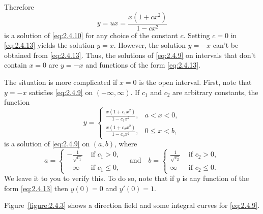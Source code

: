 \documentclass{ximera}
\begin{document}
\begin{example}
\begin{explanation}
\begin{center}
\end{center}

  

Therefore
\begin{equation} \label{eq:2.4.13}
y=ux=\frac{x(1+cx^2)}{1-cx^2}
\end{equation}
is a solution of \eqref{eq:2.4.10} for any choice of the constant $c$.
Setting $c=0$ in \eqref{eq:2.4.13} yields the solution $y=x$. However, the
solution $y=-x$ can't be obtained from \eqref{eq:2.4.13}. Thus, the
solutions of \eqref{eq:2.4.9} on intervals that don't contain $x=0$ are
$y=-x$ and functions of the form \eqref{eq:2.4.13}.

The situation is more complicated if $x=0$ is the open interval.
 First, note that $y=-x$ satisfies \eqref{eq:2.4.9}
on $(-\infty,\infty)$. If $c_1$ and $c_2$ are arbitrary constants,
 the function
\begin{equation} \label{eq:2.4.14}
y=\left\{\begin{array}{ll} \frac{x(1+c_1x^2)}{1-c_1x^2},&a<x<0,\\
\frac{x(1+c_2x^2)}{1-c_2x^2},&0\leq x<b,
 \end{array}\right.
\end{equation}
is a solution of \eqref{eq:2.4.9} on $(a,b)$, where
$$
a=\left\{\begin{array}{cl}-\frac{1}{\sqrt{c_1}}&\text{ if }c_1>0,\\
-\infty&\text{ if }c_1\leq 0,
\end{array}\right. \quad\text{and}\quad
b=\left\{\begin{array}{cl}\frac{1}{\sqrt{c_2}}&\text{ if }c_2>0,\\
\infty&\text{ if }c_2\leq 0.
\end{array}\right.
$$
We leave it to you to verify this. To do so, note that if $y$ is
any function of the form \eqref{eq:2.4.13} then $y(0)=0$ and $y'(0)=1$.


Figure~\ref{figure:2.4.3} shows a direction field and some integral curves
for \eqref{eq:2.4.9}.




\end{explanation}
\end{example}
\end{document}
